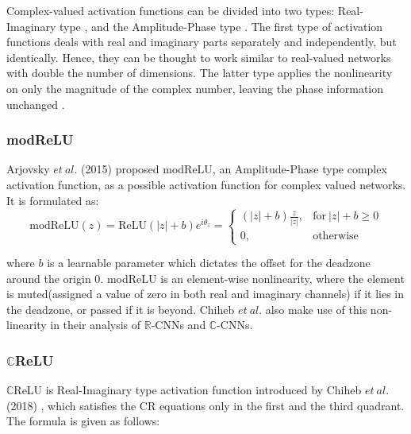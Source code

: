      
 Complex-valued activation functions can be divided into two types: Real-Imaginary type , and the Amplitude-Phase type \cite{hirose2012complex}.
 The first type of activation functions deals with real and imaginary parts separately and independently, but identically. Hence, they can be thought to work similar to real-valued networks with double the number of dimensions.  The latter type applies the nonlinearity on only the magnitude of the complex number, leaving the phase information unchanged \cite{page45hirose2012complex} . 
 
 
 
 

 \subsubsection{modReLU}
Arjovsky $et \ al.$ (2015) \cite{ArjovskySB15} proposed modReLU, an Amplitude-Phase type complex activation function, as a possible activation function for complex valued networks. It is formulated as:
 \begin{equation}
\mathrm{modReLU}(z) = \mathrm{ReLU}(|z| + b)e^{i\theta_{z}}
{}=\begin{cases} (|z| + b)\frac{z}{|z|} , &\mathrm{for} \ |z| + b\ge 0 \\ 0 , &\textrm{otherwise} \end{cases}
\end{equation}

where $b$ is a learnable parameter which dictates the offset for the deadzone around the origin $0$. modReLU is an element-wise nonlinearity, where the element is muted(assigned a value of zero in both real and imaginary channels) if it lies in the deadzone, or passed if it is beyond. Chiheb $et \ al.$ \cite{trabelsi2018deep} also make use of this non-linearity in their analysis of $\mathbb{R}$-CNNs and $\mathbb{C}$-CNNs.


\subsubsection{$\mathbb{C}$ReLU}
$\mathbb{C}$ReLU is Real-Imaginary type activation function introduced by Chiheb $et \ al.$ (2018) \cite{trabelsi2018deep}, which satisfies the CR equations only in the first and the third quadrant. The formula is given as follows:

